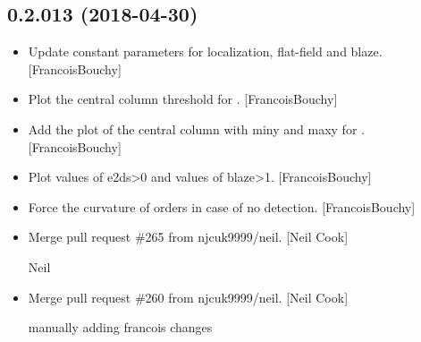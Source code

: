\documentclass[a4paper,10pt,english]{report}
\begin{document}
\subsection{0.2.013 (2018-04-30)}
\label{\detokenize{misc/changelog:id448}}\begin{itemize}
\item {} 
Update constant parameters for localization, flat-field and blaze.
{[}FrancoisBouchy{]}

\item {} 
Plot the central column threshold for . {[}FrancoisBouchy{]}

\item {} 
Add the plot of the central column with miny and maxy for .
{[}FrancoisBouchy{]}

\item {} 
Plot values of e2ds\textgreater{}0 and values of blaze\textgreater{}1. {[}FrancoisBouchy{]}

\item {} 
Force the curvature of orders in case of no detection.
{[}FrancoisBouchy{]}

\item {} 
Merge pull request \#265 from njcuk9999/neil. {[}Neil Cook{]}

Neil

\item {} 
Merge pull request \#260 from njcuk9999/neil. {[}Neil Cook{]}

manually adding francois changes

\end{itemize}
\end{document}
